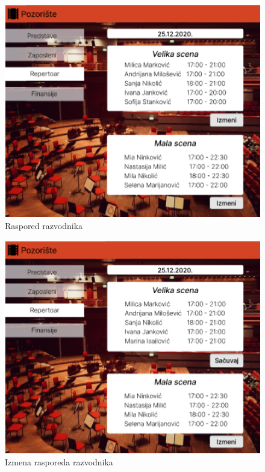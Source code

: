 \documentclass[a4paper]{article}
\begin{document}
\begin{figure}[H]
  \begin{center}
    \includegraphics[width=130mm]{../images/ui_raspored1.png}
  \end{center}
  \caption{Raspored razvodnika}
  \label{raspored_razvodnika}
\end{figure}

\begin{figure}[H]
  \begin{center}
    \includegraphics[width=130mm]{../images/ui_raspored2.png}
  \end{center}
  \caption{Izmena rasporeda razvodnika}
  \label{izmena_rasporeda_razvodnika}
\end{figure}
\end{document}
